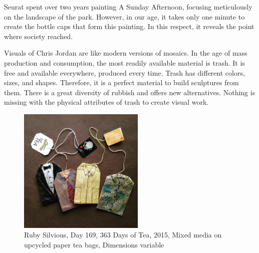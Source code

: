 Seurat spent over two years painting A Sunday Afternoon, focusing meticulously on the landscape of the park. However, in our age, it takes only one minute to create the bottle caps that form this painting. In this respect, it reveals the point where society reached.

Visuals of Chris Jordan are like modern versions of mosaics. In the age of mass production and consumption, the most readily available material is trash. It is free and available everywhere, produced every time. Trash has different colors, sizes, and shapes. Therefore, it is a perfect material to build sculptures from them. There is a great diversity of rubbish and offers new alternatives. Nothing is missing with the physical attributes of trash to create visual work.


\begin{figure}[h!]
  \centering
  \includegraphics[height=6cm]{graphics/rubysilvious-teabag-Day169.jpg}
  \caption{Ruby Silvious, Day 169, 363 Days of Tea, 2015, Mixed media on upcycled paper tea bags, Dimensions variable}
  \label{fig:RubySilvious_TeaBag}
\end{figure}
  
 

